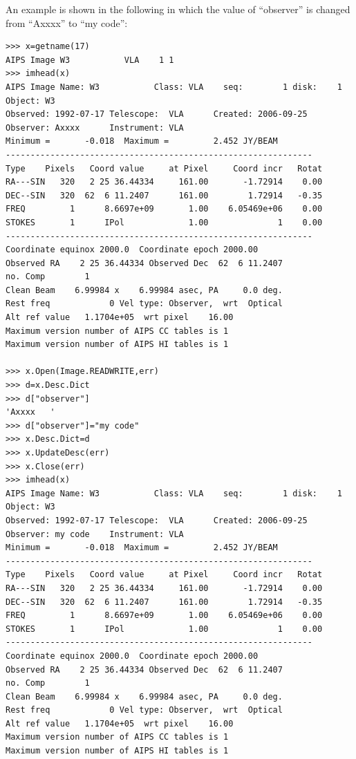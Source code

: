 \documentclass[11pt]{report}
\begin{document}
An example is shown in the following in which the value of
``observer'' is changed from ``Axxxx'' to ``my code'':
\begin{verbatim}
>>> x=getname(17)
AIPS Image W3           VLA    1 1
>>> imhead(x)
AIPS Image Name: W3           Class: VLA    seq:        1 disk:    1
Object: W3      
Observed: 1992-07-17 Telescope:  VLA      Created: 2006-09-25
Observer: Axxxx      Instrument: VLA      
Minimum =       -0.018  Maximum =         2.452 JY/BEAM 
--------------------------------------------------------------
Type    Pixels   Coord value     at Pixel     Coord incr   Rotat
RA---SIN   320   2 25 36.44334     161.00       -1.72914    0.00
DEC--SIN   320  62  6 11.2407      161.00        1.72914   -0.35
FREQ         1      8.6697e+09       1.00    6.05469e+06    0.00
STOKES       1      IPol             1.00              1    0.00
--------------------------------------------------------------
Coordinate equinox 2000.0  Coordinate epoch 2000.00
Observed RA    2 25 36.44334 Observed Dec  62  6 11.2407 
no. Comp        1
Clean Beam    6.99984 x    6.99984 asec, PA     0.0 deg.
Rest freq            0 Vel type: Observer,  wrt  Optical
Alt ref value   1.1704e+05  wrt pixel    16.00
Maximum version number of AIPS CC tables is 1 
Maximum version number of AIPS HI tables is 1 

>>> x.Open(Image.READWRITE,err)
>>> d=x.Desc.Dict
>>> d["observer"]
'Axxxx   '
>>> d["observer"]="my code"
>>> x.Desc.Dict=d
>>> x.UpdateDesc(err)
>>> x.Close(err)
>>> imhead(x)
AIPS Image Name: W3           Class: VLA    seq:        1 disk:    1
Object: W3      
Observed: 1992-07-17 Telescope:  VLA      Created: 2006-09-25
Observer: my code    Instrument: VLA      
Minimum =       -0.018  Maximum =         2.452 JY/BEAM 
--------------------------------------------------------------
Type    Pixels   Coord value     at Pixel     Coord incr   Rotat
RA---SIN   320   2 25 36.44334     161.00       -1.72914    0.00
DEC--SIN   320  62  6 11.2407      161.00        1.72914   -0.35
FREQ         1      8.6697e+09       1.00    6.05469e+06    0.00
STOKES       1      IPol             1.00              1    0.00
--------------------------------------------------------------
Coordinate equinox 2000.0  Coordinate epoch 2000.00
Observed RA    2 25 36.44334 Observed Dec  62  6 11.2407 
no. Comp        1
Clean Beam    6.99984 x    6.99984 asec, PA     0.0 deg.
Rest freq            0 Vel type: Observer,  wrt  Optical
Alt ref value   1.1704e+05  wrt pixel    16.00
Maximum version number of AIPS CC tables is 1 
Maximum version number of AIPS HI tables is 1 
\end{verbatim}
\end{document}
